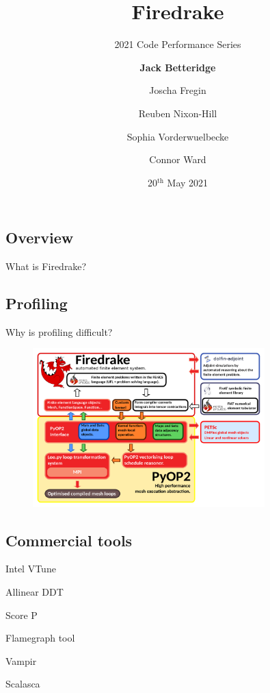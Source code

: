 \documentclass[pdf,aspectratio=169]{beamer}
\title[Firedrake]{Firedrake}
\subtitle{2021 Code Performance Series}
\author[JB,JF,RNH,SV,CW]{\textbf{Jack Betteridge} \and Joscha Fregin \and Reuben Nixon-Hill \and Sophia Vorderwuelbecke \and Connor Ward}
\date[20/5/2021]{20${}^\text{th}$ May 2021}
\begin{document}
\maketitle

\subsection{Overview}
\begin{frame}{What is Firedrake?}
\centering
\end{frame}

\subsection{Profiling}
\begin{frame}{Why is profiling difficult?}
\centering
\end{frame}

\begin{frame}
\begin{figure}
	\includegraphics[width=0.8\textwidth]{firedrake_diagram.pdf}
\end{figure}
\end{frame}

\subsection{Commercial tools}
\begin{frame}{}
Intel VTune

Allinear DDT
\end{frame}

\begin{frame}
Score P
\end{frame}

\begin{frame}
Flamegraph tool
\end{frame}

\begin{frame}
Vampir

Scalasca
\end{frame}
\end{document}
